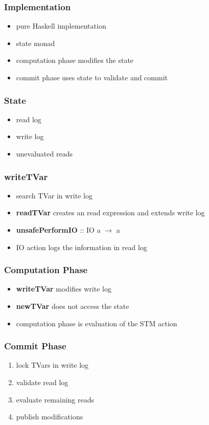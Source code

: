 \documentclass{beamer}
\newcommand{\code}[1]{\textbf{#1}}
\begin{document}

  \begin{frame}
  \frametitle{Implementation}
  \begin{itemize}\setlength\itemsep{1em}
   \item pure Haskell implementation
   \item state monad
   \item computation phase modifies the state 
   \item commit phase uses state to validate and commit
  \end{itemize}
  \end{frame}

  \begin{frame}
  \frametitle{State}
  \begin{itemize}\setlength\itemsep{1em}
   \item read log
   \item write log
   \item unevaluated reads
  \end{itemize}
  \end{frame}

  
  \begin{frame}
  \frametitle{writeTVar}
  \begin{itemize}\setlength\itemsep{1em}
   \item search TVar in write log
   \item \code{readTVar} creates an read expression and extends write log
   \item \code{unsafePerformIO} :: IO a $\rightarrow$ a 
   \item IO action logs the information in read log
  \end{itemize}
  \end{frame}

  \begin{frame}
  \frametitle{Computation Phase}
  \begin{itemize}\setlength\itemsep{1em}
   \item \code{writeTVar} modifies write log
   \item \code{newTVar} does not access the state
   \item computation phase is evaluation of the STM action 
  \end{itemize}
  \end{frame}

  
  \begin{frame}
  \frametitle{Commit Phase}
  \begin{enumerate}\setlength\itemsep{1em}
   \item lock TVars in write log
   \item validate read log
   \item evaluate remaining reads
   \item publish modifications
  \end{enumerate}
  \end{frame}
  
\end{document}
